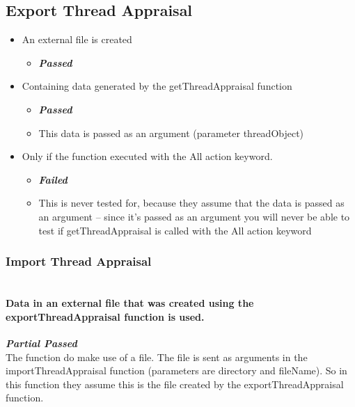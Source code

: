 \subsection{Export Thread Appraisal}
\begin{itemize}
	\item An external file is created 
	\begin{itemize}
		\item \color{green}\textbf{\small \emph{Passed}}
	\end{itemize}
	\item Containing data generated by the getThreadAppraisal function  
	\begin{itemize}
		\item \color{green}
\textbf{\small \emph{Passed}} \\\color{black}
		\item This data is passed as an argument (parameter threadObject)
	\end{itemize}
	\item Only if the function executed with the All action keyword.
	\begin{itemize}
		\item \color{red}
\textbf{\small \emph{Failed}} \\ \color{black}
		\item This is never tested for, because they assume that the data is passed as an argument – since it’s passed as an argument you will never be able to test if getThreadAppraisal is called with the All action keyword
	\end{itemize}
\end{itemize}


\subsubsection{Import Thread Appraisal}

\paragraph{\color{black} \\ Data in an external file that was created using the exportThreadAppraisal function is used.\\} 
\color{myOrange}
\textbf{\small \emph{Partial Passed}} \\
\color{black}The function do make use of a file. The file is sent as arguments in the importThreadAppraisal function (parameters are directory and  fileName). So in this function they assume this is the file created by the exportThreadAppraisal function.
\par

